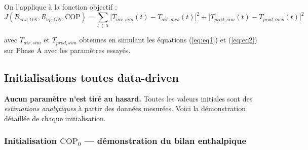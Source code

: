 \documentclass[11pt,a4paper]{article}
\begin{document}
On l'applique à la fonction objectif :
\begin{equation}
J(R_{env,ON}, R_{ap,ON}, \mathrm{COP}) =
\sum_{t \in \text{A}}\!\!\Big[T_{air,sim}(t) - T_{air,mes}(t)\Big]^2
+ \Big[T_{prod,sim}(t) - T_{prod,mes}(t)\Big]^2
\end{equation}

avec $T_{air,sim}$ et $T_{prod,sim}$ obtenues en simulant les équations (\ref{eq:eq1}) et
(\ref{eq:eq2}) sur Phase A avec les paramètres essayés.

\subsection{Initialisations toutes data-driven}

\textbf{Aucun paramètre n'est tiré au hasard.} Toutes les valeurs initiales sont des
\emph{estimations analytiques} à partir des données mesurées. Voici la démonstration
détaillée de chaque initialisation.

\subsubsection*{Initialisation $\mathrm{COP}_0$ — démonstration du bilan enthalpique}
\end{document}
